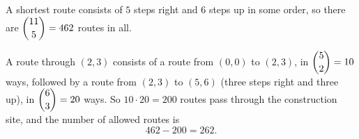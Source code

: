 A shortest route consists of $5$ steps right and $6$ steps up in some order, so there are $\dbinom{11}{5}=462$ routes in all.

A route through $(2,3)$ consists of a route from $(0,0)$ to $(2,3)$, in $\dbinom{5}{2}=10$ ways, followed by a route from $(2,3)$ to $(5,6)$ (three steps right and three up), in $\dbinom{6}{3}=20$ ways. So $10\cdot20=200$ routes pass through the construction site, and the number of allowed routes is
\[462-200=\boxed{262}.\]
